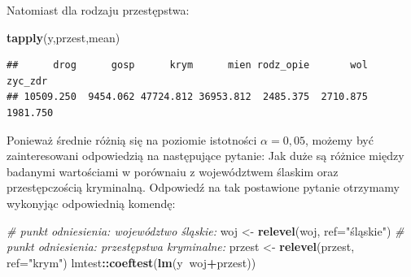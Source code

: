 \documentclass[polish,]{book}
\newenvironment{Shaded}{\begin{snugshade}}{\end{snugshade}}
\newcommand{\CommentTok}[1]{\textcolor[rgb]{0.56,0.35,0.01}{\textit{#1}}}
\newcommand{\DataTypeTok}[1]{\textcolor[rgb]{0.13,0.29,0.53}{#1}}
\newcommand{\KeywordTok}[1]{\textcolor[rgb]{0.13,0.29,0.53}{\textbf{#1}}}
\newcommand{\NormalTok}[1]{#1}
\newcommand{\OperatorTok}[1]{\textcolor[rgb]{0.81,0.36,0.00}{\textbf{#1}}}
\newcommand{\StringTok}[1]{\textcolor[rgb]{0.31,0.60,0.02}{#1}}
\begin{document}
Natomiast dla rodzaju przestępstwa:

\begin{Shaded}
\begin{Highlighting}[]
\KeywordTok{tapply}\NormalTok{(y,przest,mean)}
\end{Highlighting}
\end{Shaded}

\begin{verbatim}
##      drog      gosp      krym      mien rodz_opie       wol   zyc_zdr 
## 10509.250  9454.062 47724.812 36953.812  2485.375  2710.875  1981.750
\end{verbatim}

Ponieważ średnie różnią się na poziomie istotności \(\alpha = 0,05\), możemy być zainteresowani odpowiedzią na następujące pytanie: Jak duże są różnice między badanymi wartościami w porównaiu z województwem ślaskim oraz przestępczością kryminalną. Odpowiedź na tak postawione pytanie otrzymamy wykonyjąc odpowiednią komendę:

\begin{Shaded}
\begin{Highlighting}[]
\CommentTok{# punkt odniesienia: województwo śląskie:}
\NormalTok{woj <-}\StringTok{ }\KeywordTok{relevel}\NormalTok{(woj, }\DataTypeTok{ref=}\StringTok{"śląskie"}\NormalTok{)}
\CommentTok{# punkt odniesienia: przestępstwa kryminalne:}
\NormalTok{przest <-}\StringTok{ }\KeywordTok{relevel}\NormalTok{(przest, }\DataTypeTok{ref=}\StringTok{"krym"}\NormalTok{)}
\NormalTok{lmtest}\OperatorTok{::}\KeywordTok{coeftest}\NormalTok{(}\KeywordTok{lm}\NormalTok{(y}\OperatorTok{~}\NormalTok{woj}\OperatorTok{+}\NormalTok{przest))}
\end{Highlighting}
\end{Shaded}
\end{document}
